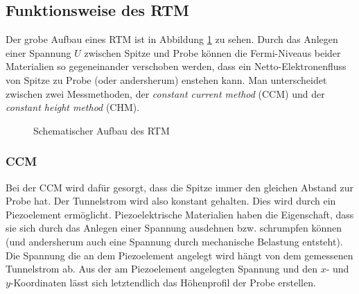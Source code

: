 \subsection{Funktionsweise des RTM}
Der grobe Aufbau eines RTM ist in Abbildung \ref{fig:RTM} zu sehen. Durch das Anlegen einer Spannung $U$ zwischen Spitze und Probe können die Fermi-Niveaus beider Materialien so gegeneinander verschoben werden, dass ein Netto-Elektronenfluss von Spitze zu Probe (oder andersherum) enstehen kann. 
Man unterscheidet zwischen zwei Messmethoden, der \textit{constant current method} (CCM) und der \textit{constant height method} (CHM). 
\begin{figure}[h]
  \centering
  \caption{Schematischer Aufbau des RTM}
  \label{fig:RTM}
\end{figure}

\subsubsection{CCM}
Bei der CCM wird dafür gesorgt, dass die Spitze immer den gleichen Abstand zur Probe hat. Der Tunnelstrom wird also konstant gehalten. Dies wird durch ein Piezoelement ermöglicht. Piezoelektrische Materialien haben die Eigenschaft, dass sie sich durch das Anlegen einer Spannung ausdehnen bzw. schrumpfen können (und andersherum auch eine Spannung durch mechanische Belastung entsteht). Die Spannung die an dem Piezoelement angelegt wird hängt von dem gemessenen Tunnelstrom ab. Aus der am Piezoelement angelegten Spannung und den $x$- und $y$-Koordinaten lässt sich letztendlich das Höhenprofil der Probe erstellen.


